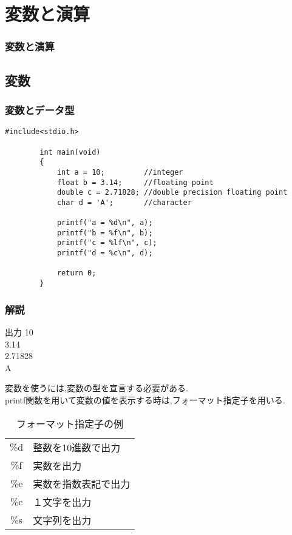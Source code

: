 \documentclass[dvipdfmx]{beamer}
\begin{document}
\section{変数と演算}
\begin{frame}[label=12]
    \frametitle{変数と演算}
    \tableofcontents[sections={2,6}]
    \vfill \hfill 
    \hyperlink{11}{}
    \space
    \hyperlink{13}{}
\end{frame}

\subsection{変数}
\begin{frame}[t, fragile, label=13]
    \frametitle{変数とデータ型}
    \begin{lstlisting}[gobble=8, caption=variable.c, label=variable]
        #include<stdio.h>

        int main(void)
        {
            int a = 10;         //integer 
            float b = 3.14;     //floating point 
            double c = 2.71828; //double precision floating point
            char d = 'A';       //character 

            printf("a = %d\n", a);
            printf("b = %f\n", b);
            printf("c = %lf\n", c);
            printf("d = %c\n", d);

            return 0;
        }
    \end{lstlisting}
    \vfill \hfill 
    \hyperlink{12}{}
    \space
    \hyperlink{14}{}
\end{frame}

\begin{frame}[t, fragile, label=14]
    \frametitle{解説}
    \begin{block}{出力}
    10\\
    3.14\\
    2.71828\\
    A
    \end{block}
    変数を使うには,変数の型を宣言する必要がある.\\
    printf関数を用いて変数の値を表示する時は,フォーマット指定子を用いる.
    \begin{table}[h]
        \caption{フォーマット指定子の例}
        \label{format}
        \centering
        \begin{tabular}{cl}
            \hline
            \%d & 整数を10進数で出力\\
            \%f & 実数を出力\\
            \%e & 実数を指数表記で出力\\
            \%c & １文字を出力\\
            \%s & 文字列を出力\\
            \hline
        \end{tabular}
    \end{table}
    \vfill \hfill 
    \hyperlink{13}{}
    \space
    \hyperlink{15}{}
\end{frame}
\end{document}
